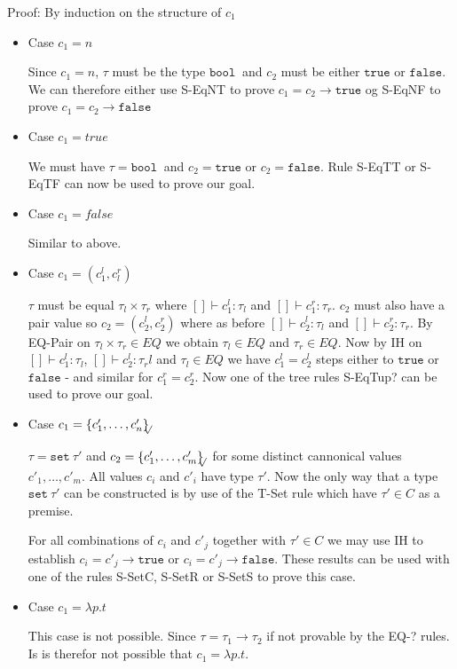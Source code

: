 \documentclass[a4paper]{article}
\newcommand{\s}[1]{\mathtt{#1}}
\newcommand{\sLb}{\s{\{}}
\newcommand{\sRb}{\s{\}}}
\newcommand{\sbool}{\s{bool\ }}
\newcommand{\sseta}{\s{set\ }}
\newcommand{\strue}{\s{true}}
\newcommand{\sfalse}{\s{false}}
\newcommand{\sset}[1]{\sLb #1 \sRb}
\newcommand{\ssetc}[1]{\sset{#1}_{\!\!\!\surd}}
\newcommand{\step}{\to}
\begin{document}
Proof: By induction on the structure of $c_1$ 
\begin{itemize}
\item Case $c_1 = n$ 

Since $c_1 = n$, $\tau$ must be the type $\sbool$ and $c_2$ must be either $\strue$ or $\sfalse$. We can therefore either use S-EqNT to prove $c_1 = c_2 \step \strue$ og S-EqNF to prove $c_1 = c_2 \step \sfalse$
 
\item Case $c_1 = true$

We must have $\tau = \sbool$ and $c_2 = \strue$ or $c_2 = \sfalse$. Rule S-EqTT or S-EqTF can now be used to prove our goal.

\item Case $c_1 = false$

Similar to above.

\item Case $c_1 = (c_1^l, c_l^r)$

$\tau$ must be equal $\tau_l \times \tau_r$ where $[]\vdash c_1^l:\tau_l$ and $[]\vdash c_1^r:\tau_r$. $c_2$ must also have a pair value so $c_2 = (c_2^l, c_2^r)$ where as before $[]\vdash c_2^l:\tau_l$ and $[]\vdash c_2^r:\tau_r$. By EQ-Pair on $\tau_l \times \tau_r \in EQ$ we obtain $\tau_l \in EQ$ and $\tau_r \in EQ$. Now by IH on $[]\vdash c_1^l:\tau_l$, $[]\vdash c_2^l:\tau_rl$ and $\tau_l \in EQ$ we have $c_1^l = c_2^l$ steps either to $\strue$ or $\sfalse$ - and similar for $c_1^r = c_2^r$. Now one of the tree rules S-EqTup? can be used to prove our goal. 

\item Case $c_1 = \ssetc{c'_1,\ldots,c'_n}$

$\tau = \sseta \tau'$ and $c_2 = \ssetc{c'_1,\ldots,c'_m}$ for some distinct cannonical values $c'_1,\ldots,c'_m$. All values $c_i$ and $c'_i$ have type $\tau'$. Now the only way that a type $\sseta \tau'$ can be constructed is by use of the T-Set rule which have $\tau' \in C$ as a premise. 

For all combinations of $c_i$ and $c'_j$ together with $\tau' \in C$ we may use IH to establish $c_i = c'_j \step \strue$ or $c_i = c'_j \step \sfalse$. These results can be used with one of the rules S-SetC, S-SetR or S-SetS to prove this case.

\item Case $c_1 = \lambda p.t$

This case is not possible. Since $\tau = \tau_1 \to \tau_2$ if not provable by the EQ-? rules. Is is therefor not possible that $c_1 = \lambda p.t$. 
\end{itemize}
  
\end{document}
